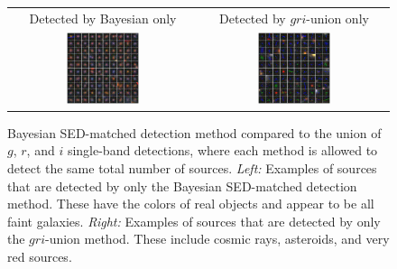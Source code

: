 \documentclass[11pt,letterpaper,linenumbers]{aastex63}
\begin{document}
\begin{figure}[p!]
  \begin{center}
    \begin{tabular}{cc}
      Detected by Bayesian only &
      Detected by $gri$-union only \\
      \includegraphics[width=0.4\textwidth]{bayes-only}
      &
      \includegraphics[width=0.4\textwidth]{gri-only}
    \end{tabular}
    \caption{Bayesian SED-matched detection method compared to the
      union of $g$, $r$, and $i$ single-band detections, where each
      method is allowed to detect the same total number of sources.
      \emph{Left:} Examples of sources that are detected by only the
      Bayesian SED-matched detection method.  These have the colors of
      real objects and appear to be all faint galaxies.  \emph{Right:}
      Examples of sources that are detected by only the $gri$-union
      method.  These include cosmic rays,
      asteroids, and very red sources.
      \label{fig:only}}
  \end{center}
\end{figure}
\end{document}
